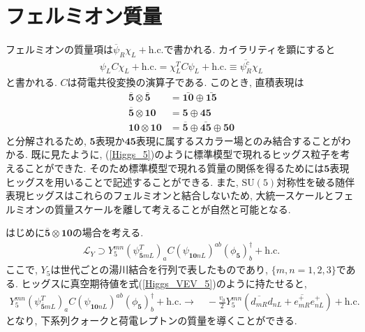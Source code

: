 \section{フェルミオン質量}
フェルミオンの質量項は$\overline{\psi}_R\chi_L +\mathrm{h.c.}$で書かれる.
カイラリティを顕にすると
\begin{align}
  \psi_L C \chi_L + \mathrm{h.c.} = \chi_L^T C \psi_L + \mathrm{h.c.} \equiv \overline{\psi_R^c}\chi_L
\end{align}
と書かれる. $C$は荷電共役変換の演算子である.
このとき, 直積表現は
\begin{align}
  \overline{\bm{5}}\otimes \bar{\bm{5}} &= \bar{\bm{10}}\oplus\bar{\bm{15}}\nonumber\\
  \overline{\bm{5}}\otimes {\bm{10}} &= \bm{5}\oplus\bm{45}\nonumber\\
  \bm{10}\otimes \bm{10} &= \overline{\bm{5}}\oplus\bar{\bm{45}}\oplus\bm{50}\nonumber
\end{align}
と分解されるため, $\bm{5}$表現か$\bm{45}$表現に属するスカラー場とのみ結合することがわかる.
既に見たように, (\ref{Higgs_5})のように標準模型で現れるヒッグス粒子を考えることができた.
そのため標準模型で現れる質量の関係を得るためには$\bm{5}$表現ヒッグスを用いることで記述することができる.
また, $\mathrm{SU(5)}$対称性を破る随伴表現ヒッグスはこれらのフェルミオンと結合しないため, 大統一スケールとフェルミオンの質量スケールを離して考えることが自然と可能となる.

はじめに$\overline{\bm{5}}\otimes {\bm{10}}$の場合を考える.
\begin{align}
  \mathcal{L}_Y \supset Y_5^{mn} (\psi^T_{\bm{\overline{5}}mL})_a C (\psi_{\bm{10}nL})^{ab}(\phi_{\bm{5}})_b^\dagger +\mathrm{h.c.}
\end{align}
ここで, $Y_5$は世代ごとの湯川結合を行列で表したものであり, $\{m, n= 1,2,3\}$である.
ヒッグスに真空期待値を式(\ref{Higgs_VEV_5})のように持たせると,
\begin{align}
  Y_5^{mn} (\psi^T_{\bm{\overline{5}}mL})_a C (\psi_{\bm{10}nL})^{ab}(\phi_{\bm{5}})_b^\dagger +\mathrm{h.c.} \rightarrow\quad -\frac{v_0}{2}Y_5^{mn}\left(\overline{d_{mR}}d_{nL} + \overline{e_{mR}^+}e^+_{nL}\right) + \mathrm{h.c.}
\end{align}
となり, 下系列クォークと荷電レプトンの質量を導くことができる.


